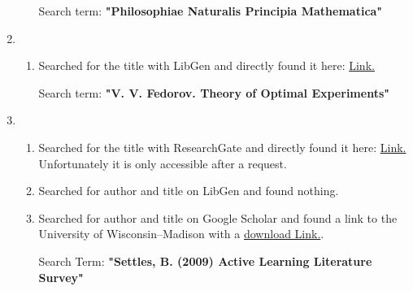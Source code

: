 \documentclass{article}
\begin{document}
\begin{enumerate}
\begin{enumerate}
        Search term: \textbf{"Philosophiae Naturalis Principia Mathematica"}
    \end{enumerate}

    \item \begin{enumerate}
        \item Searched for the title with LibGen and directly found it here: \href{https://cloudflare-ipfs.com/ipfs/bafykbzacebosyximsd3u4dnnhftdyq7xyn2lyojmzej4zklcuspyvqb6tcz5w?filename=V.V.%20Fedorov%20-%20Theory%20of%20Optimal%20Experiments-Academic%20Press%20%281972%29.pdf}{Link.}
        
        Search term: \textbf{"V. V. Fedorov. Theory of Optimal Experiments"}
    \end{enumerate}

    \item \begin{enumerate}
        \item Searched for the title with ResearchGate and directly found it here: 
        \href{https://www.researchgate.net/publication/228942691_Active_Learning_Literature_Survey}{Link.}
        Unfortunately it is only accessible after a request. 
        \item Searched for author and title on LibGen and found nothing.
        \item Searched for author and title on Google Scholar and found a link to the University of Wisconsin–Madison with a \href{https://minds.wisconsin.edu/bitstream/handle/1793/60660/TR1648.pdf?sequence=1&isAllowed=y}{download Link.}.
       
        Search Term: \textbf{"Settles, B. (2009) Active Learning Literature Survey"}
    \end{enumerate}
\end{enumerate}
% 
\end{document}
